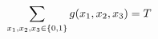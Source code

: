\documentclass[preview]{standalone}
\begin{document}
\begin{align*}
\special{dvisvgm:raw <g id='unique000'>}\sum_{x_1, x_2, x_3 \in \{0,1\}} g(x_1, x_2, x_3) = T\special{dvisvgm:raw </g>}
\end{align*}
\end{document}
